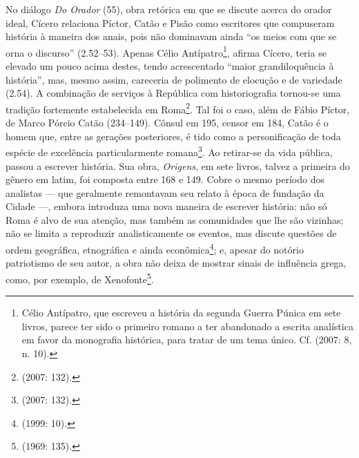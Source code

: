 No diálogo \emph{Do Orador} (55), obra retórica em que se discute acerca
do orador ideal, Cícero relaciona Píctor, Catão e Pisão como escritores que
compuseram história à maneira dos anais, pois não dominavam ainda “os meios com
que se orna o discurso” (2.52--53). Apenas Célio Antípatro\footnote{Célio
Antípatro, que escreveu a história da segunda Guerra Púnica em sete livros,
parece ter sido o primeiro romano a ter abandonado a escrita analística em
favor da monografia histórica, para tratar de um tema único.  Cf. 
(2007: 8, n. 10).}, afirma Cícero, teria se elevado um pouco acima destes,
tendo acrescentado “maior grandiloquência à história”, mas, mesmo assim,
careceria de polimento de elocução e de variedade (2.54).  A combinação de
serviços à República com historiografia tornou-se uma tradição fortemente
estabelecida em Roma\footnote{
(2007: 132).}. Tal foi o caso, além de
Fábio Píctor, de Marco Pórcio Catão (234--149). Cônsul em 195, censor em 184,
Catão é o homem que, entre as gerações posteriores, é tido como a
personificação de toda espécie de excelência particularmente romana\footnote{
(2007: 132).}. Ao retirar-se da vida pública, passou a escrever história.
Sua obra, \emph{Origens}, em sete livros, talvez a primeira do gênero em latim,
foi composta entre 168 e 149. Cobre o mesmo período dos analistas --- que
geralmente remontavam seu relato à época de fundação da Cidade ---, embora
introduza uma nova maneira de escrever história: não só Roma é alvo de sua
atenção, mas também as comunidades que lhe são vizinhas; não se limita a
reproduzir analisticamente os eventos, mas discute questões de ordem
geográfica, etnográfica e ainda econômica\footnote{ (1999: 10).};
e, apesar do notório patriotismo de seu autor, a obra não deixa de mostrar
sinais de influência grega, como, por exemplo, de Xenofonte\footnote{ 
(1969: 135).}.

